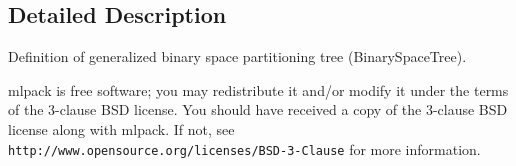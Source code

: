 \subsection{Detailed Description}
Definition of generalized binary space partitioning tree (Binary\+Space\+Tree). 

mlpack is free software; you may redistribute it and/or modify it under the terms of the 3-\/clause B\+SD license. You should have received a copy of the 3-\/clause B\+SD license along with mlpack. If not, see {\tt http\+://www.\+opensource.\+org/licenses/\+B\+S\+D-\/3-\/\+Clause} for more information. 